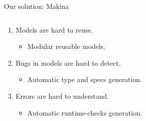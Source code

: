 \documentclass[aspectratio=169, 10pt]{beamer}
\begin{document}
\begin{frame}[label={sec:orgb8553ac}]{Our solution: Makina}
\begin{columns}
\begin{column}{0.48\columnwidth}
\begin{enumerate}
\item Models are hard to reuse.
\begin{itemize}
\item Modular reusable models. \vspace{10pt}
\end{itemize}
\item Bugs in models are hard to detect.
\begin{itemize}
\item Automatic type and specs generation. \vspace{10pt}
\end{itemize}
\item Errors are hard to understand.
\begin{itemize}
\item Automatic runtime-checks generation. \vspace{10pt}
\end{itemize}
\end{enumerate}
\end{column}
\end{columns}
\end{frame}
\end{document}
